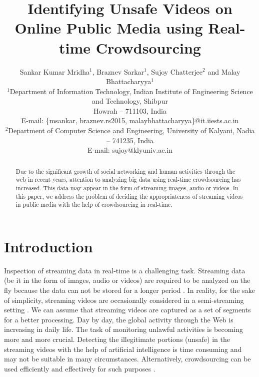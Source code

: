 \documentclass[letterpaper]{article}
\begin{document}
\title{Identifying Unsafe Videos on Online Public Media using Real-time Crowdsourcing}
\author{Sankar Kumar Mridha$^1$, Braznev Sarkar$^1$, Sujoy Chatterjee$^2$ and Malay Bhattacharyya$^1$\\
$^1$Department of Information Technology, Indian Institute of Engineering Science and Technology, Shibpur\\ Howrah -- 711103, India\\
E-mail: \{msankar, braznev.rs2015, malaybhattacharyya\}@it.iiests.ac.in\\
$^2$Department of Computer Science and Engineering, University of Kalyani, Nadia -- 741235, India\\
E-mail: sujoy@klyuniv.ac.in\\
}
\maketitle




\begin{abstract}
Due to the significant growth of social networking and human activities through the web in recent years, attention to analyzing big data using real-time crowdsourcing has increased. This data may appear in the form of streaming images, audio or videos. In this paper, we address the problem of deciding the appropriateness of streaming videos in public media with the help of crowdsourcing in real-time.
\end{abstract}




\section{Introduction}
Inspection of streaming data in real-time is a challenging task. Streaming data (be it in the form of images, audio or videos) are required to be analyzed on the fly because the data can not be stored for a longer period \cite{Muthukrishnan2005}. In reality, for the sake of simplicity, streaming videos are occasionally considered in a semi-streaming setting \cite{Galasso2014}. We can assume that streaming videos are captured as a set of segments for a better processing. Day by day, the global activity through the Web is increasing in daily life. The task of monitoring unlawful activities is becoming more and more crucial. Detecting the illegitimate portions (unsafe) in the streaming videos with the help of artificial intelligence is time consuming and may not be suitable in many circumstances. Alternatively, crowdsourcing can be used efficiently and effectively for such purposes \cite{Yeung1998}.
\end{document}
